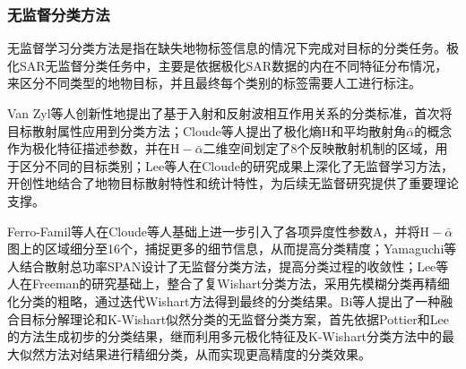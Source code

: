 \subsubsection{无监督分类方法}
无监督学习分类方法是指在缺失地物标签信息的情况下完成对目标的分类任务。极化SAR无监督分类任务中，主要是依据极化SAR数据的内在不同特征分布情况，来区分不同类型的地物目标，并且最终每个类别的标签需要人工进行标注。

Van Zyl等人创新性地提出了基于入射和反射波相互作用关系的分类标准，首次将目标散射属性应用到分类方法；Cloude等人提出了极化熵$\mathrm{H}$和平均散射角$\bar{\alpha}$的概念作为极化特征描述参数，并在$\mathrm{H}-\bar{\alpha}$二维空间划定了8个反映散射机制的区域，用于区分不同的目标类别；Lee等人在Cloude的研究成果上深化了无监督学习方法，开创性地结合了地物目标散射特性和统计特性，为后续无监督研究提供了重要理论支撑。


Ferro-Famil等人在Cloude等人基础上进一步引入了各项异度性参数$\mathrm{A}$，并将$\mathrm{H}-\bar{\alpha}$图上的区域细分至16个，捕捉更多的细节信息，从而提高分类精度；Yamaguchi等人结合散射总功率SPAN设计了无监督分类方法，提高分类过程的收敛性；Lee等人在Freeman的研究基础上，整合了复Wishart分类方法，采用先模糊分类再精细化分类的粗略，通过迭代Wishart方法得到最终的分类结果。Bi等人提出了一种融合目标分解理论和K-Wishart似然分类的无监督分类方案，首先依据Pottier和Lee的方法生成初步的分类结果，继而利用多元极化特征及K-Wishart分类方法中的最大似然方法对结果进行精细分类，从而实现更高精度的分类效果。


